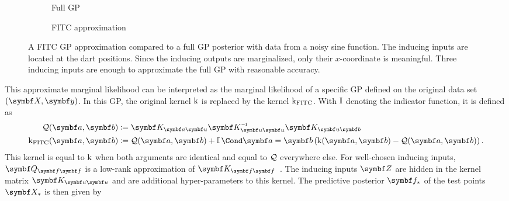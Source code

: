 \begin{figure}[tp]
    \begin{subfigure}{\halffigurewidth}
        \centering
        \caption{
            \label{fig:sparse_gp:spgp_example:gp}
            Full GP
        }
    \end{subfigure}
    \hfill
    \begin{subfigure}{\halffigurewidth}
        \centering
        \caption{
            \label{fig:sparse_gp:spgp_example:spgp}
            FITC approximation
        }
    \end{subfigure}
    \caption[FITC sparse GP approximation]{
        \label{fig:sparse_gp:spgp_example}
        A FITC GP approximation compared to a full GP posterior with data from a noisy sine function.
        The inducing inputs are located at the dart positions.
        Since the inducing outputs are marginalized, only their $x$-coordinate is meaningful.
        Three inducing inputs are enough to approximate the full GP with reasonable accuracy.
    }
\end{figure}
This approximate marginal likelihood can be interpreted as the marginal likelihood of a specific GP defined on the original data set $(\mat{X}, \mat{y})$.
In this GP, the original kernel $\operatorname{k}$ is replaced by the kernel $\operatorname{k}_{\text{FITC}}$.
With $\operatorname{\mathbb{I}}$ denoting the indicator function, it is defined as
\begin{equation}
    \begin{split}
        \Qc(\mat{a}, \mat{b}) &\coloneqq \mat{K}_{\mat{a}\mat{u}} \mat{K}_{\mat{u}\mat{u}}\inv\mat{K}_{\mat{u}\mat{b}} \\
        \K_{\text{FITC}}(\mat{a}, \mat{b}) &\coloneqq \Qc(\mat{a}, \mat{b}) + \Indicator{\mat{a} = \mat{b}} \left( \K(\mat{a}, \mat{b}) - \Qc(\mat{a}, \mat{b}) \right).
    \end{split}
\end{equation}
This kernel is equal to $\operatorname{k}$ when both arguments are identical and equal to $\mathcal{Q}$ everywhere else.
For well-chosen inducing inputs, $\mat{Q}_{\mat{f}\mat{f}}$ is a low-rank approximation of $\mat{K}_{\mat{f}\mat{f}}$~\parencite{snelson_flexible_2007}.
The inducing inputs $\mat{Z}$ are hidden in the kernel matrix $\mat{K}_{\mat{u}\mat{u}}$ and are additional hyper-parameters to this kernel.
The predictive posterior $\mat{f}_\ast$ of the test points $\mat{X}_\ast$ is then given by
